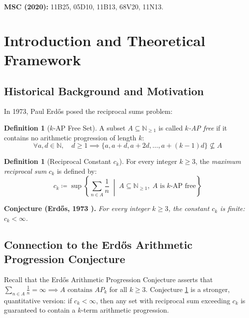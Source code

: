 \documentclass[11pt,a4paper]{article}
\theoremstyle{definition}
\newtheorem{definition}[theorem]{Definition}
\begin{document}
\noindent\textbf{MSC (2020):} 11B25, 05D10, 11B13, 68V20, 11N13.

\tableofcontents
\newpage

\section{Introduction and Theoretical Framework}

\subsection{Historical Background and Motivation}
In 1973, Paul Erd\H{o}s \cite{erdos1973ap} posed the reciprocal sums problem:

\begin{definition}[$k$-AP Free Set]\label{def:ap_free}
A subset $A \subseteq \mathbb{N}_{\ge 1}$ is called \emph{$k$-AP free} if it contains no arithmetic progression of length $k$:
\begin{equation}\label{eq:ap_free_def}
\forall a, d \in \mathbb{N}, \quad d \ge 1 \implies \{ a, a + d, a + 2d, \dots, a + (k - 1)d \} \not\subseteq A
\end{equation}
\end{definition}

\begin{definition}[Reciprocal Constant $c_k$]\label{def:reciprocal_constant}
For every integer $k \ge 3$, the \emph{maximum reciprocal sum} $c_k$ is defined by:
\begin{equation}\label{eq:ck_def}
c_k \coloneqq \sup \left\{ \sum_{n \in A} \frac{1}{n} \;\middle|\; A \subseteq \mathbb{N}_{\ge 1}, \; A \text{ is } k\text{-AP free} \right\}
\end{equation}
\end{definition}

\noindent\textbf{Conjecture (Erd\H{o}s, 1973 \cite{erdos1973ap}).} \textit{For every integer $k \ge 3$, the constant $c_k$ is finite: $c_k < \infty$.}

\subsection{Connection to the Erd\H{o}s Arithmetic Progression Conjecture}
Recall that the Erd\H{o}s Arithmetic Progression Conjecture asserts that $\sum_{n \in A} \frac{1}{n} = \infty \implies A \text{ contains } AP_k$ for all $k \ge 3$.
Conjecture \ref{def:reciprocal_constant} is a stronger, quantitative version: if $c_k < \infty$, then any set with reciprocal sum exceeding $c_k$ is guaranteed to contain a $k$-term arithmetic progression.
\end{document}
